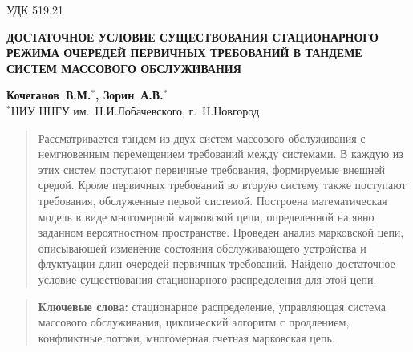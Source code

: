 \documentclass[a4paper,twoside]{article}
\theoremstyle{theorem}
\theoremstyle{remark}
\newcommand{\pages}{1-8}
\begin{document}
\pagestyle{headings}
\makeatletter
\renewcommand{\@evenhead}{\raisebox{0pt}[\headheight][0pt]{\vbox{\hbox to\textwidth{\thepage\hfill \strut {\small Кочеганов~В.М., Зорин~А.В.}}\hrule}}}
\renewcommand{\@oddhead}{\raisebox{0pt}[\headheight][0pt]{\vbox{\hbox to\textwidth{{\small ДОСТАТОЧНОЕ УСЛОВИЕ СУЩЕСТВОВАНИЯ СТАЦИОНАРНОГО ... }\hfill \strut\thepage}\hrule}}}
\makeatother

\thispagestyle{plain}
УДК 519.21
\begin{center}
{\bf ДОСТАТОЧНОЕ УСЛОВИЕ СУЩЕСТВОВАНИЯ СТАЦИОНАРНОГО РЕЖИМА ОЧЕРЕДЕЙ ПЕРВИЧНЫХ ТРЕБОВАНИЙ В ТАНДЕМЕ СИСТЕМ МАССОВОГО ОБСЛУЖИВАНИЯ
}
\vspace{4mm}\par
{\bf Кочеганов~В.М.$^{*}$, Зорин~А.В.$^{*}$}\\
$^{*}$НИУ ННГУ им.~Н.И.Лобачевского, г.~Н.Новгород\\
\end{center}
\vspace{2mm}\par



\begin{quote}

Рассматривается тандем из двух систем массового обслуживания с немгновенным перемещением требований между системами. 
В каждую из этих систем поступают первичные требования, формируемые внешней средой. Кроме первичных требований во вторую систему также поступают требования, обслуженные первой системой.
Построена математическая модель в виде многомерной марковской цепи, определенной на явно заданном вероятностном пространстве. Проведен анализ  марковской цепи, описывающей изменение состояния обслуживающего устройства и флуктуации длин очередей первичных требований. Найдено достаточное условие существования стационарного распределения для этой цепи.
\end{quote}

\begin{quote}
{\bf Ключевые слова:} стационарное распределение, управляющая система массового обслуживания, циклический алгоритм с продлением, конфликтные потоки, многомерная счетная марковская цепь.
\end{quote}
\vspace{5mm}
\end{document}
